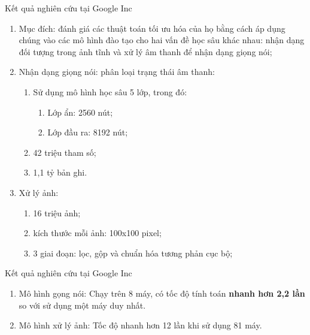 \documentclass[notheorems,hyperref={bookmarks=true}]{beamer}
\theoremstyle{plain}
\numberwithin{equation}{section}
\begin{document}
\begin{footnotesize}
\begin{frame}{Kết quả nghiên cứu tại Google Inc}
\begin{enumerate}[-]
	\item Mục đích:  đánh giá các thuật toán tối ưu hóa của họ bằng cách áp dụng chúng vào các mô hình đào tạo cho hai vấn đề học sâu khác nhau: nhận dạng đối tượng trong ảnh tĩnh và xử lý âm thanh để nhận dạng giọng nói; \pause
		\item Nhận dạng giọng nói: phân loại trạng thái âm thanh: \pause		        	\begin{enumerate}[+]
		\item Sử dụng mô hình học sâu 5 lớp, trong đó:
		\begin{enumerate}[o]
			\item Lớp ẩn: 2560 nút;
			\item Lớp đầu ra: 8192 nút;
		\end{enumerate}
		\item 42 triệu tham số;
		\item 1,1 tỷ bản ghi. \pause
	\end{enumerate}
	\item Xử lý ảnh: \pause
	\begin{enumerate}[+]
		\item 16 triệu ảnh;
		\item kích thước mỗi ảnh: 100x100 pixel;
		\item 3 giai đoạn: lọc, gộp và chuẩn hóa tương phản cục bộ;
	\end{enumerate}
\end{enumerate}

\end{frame}

\begin{frame}{Kết quả nghiên cứu tại Google Inc}
\begin{enumerate}[-]
	\item Mô hình gọng nói: \pause
Chạy trên 8 máy, có tốc độ tính toán \textbf{ nhanh hơn 2,2 lần} so với sử dụng một máy duy nhất. \pause
	\item Mô hình xử lý ảnh: 
Tốc độ nhanh hơn 12 lần khi sử dụng 81 máy.
\end{enumerate}
\end{frame}


\end{footnotesize}
\end{document}
